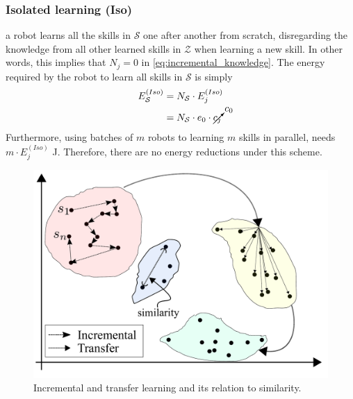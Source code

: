 \subsubsection{\textbf{Isolated learning (Iso)}} a robot learns all the skills in $\mathcal{S}$ one after another from scratch, disregarding the knowledge from all other learned skills in $\mathcal{Z}$ when learning a new skill. In other words, this implies that $N_j = 0$ in \eqref{eq:incremental_knowledge}. The energy required by the robot to learn all skills in $\mathcal{S}$ is simply
\begin{align}
    \begin{split}
      E^{(Iso)}_{\mathcal{S}} &= N_{\mathcal{S}} \cdot E^{(Iso)}_j\\ 
      &= N_{\mathcal{S}} \cdot e_{0} \cdot \cancelto{c_{0}}{c_{j}} 
    \end{split}
\end{align}
Furthermore, using batches of $m$ robots to learning $m$ skills in parallel, needs $m\cdot E^{(Iso)}_j$ \unit[]{J}. Therefore, there are no energy reductions under this scheme.
\begin{figure}[!t]
	\centering
	\includegraphics[width=0.9\columnwidth]{fig/incremental_transfer_similarity_v2.pdf}
	\caption{Incremental and transfer learning and its relation to similarity.}
	\label{fig:incremental_transfer_similarity}
\end{figure}
